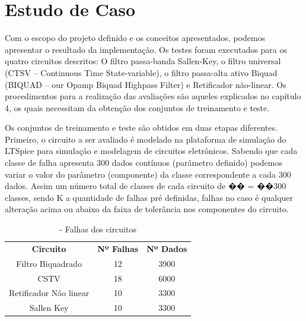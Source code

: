 
\chapter{Estudo de Caso}

Com o escopo do projeto definido e os conceitos apresentados, podemos apresentar o resultado da implementação. Os testes foram executados para os quatro circuitos descritos: O filtro passa-banda Sallen-Key, o filtro universal (CTSV – Continuous Time State-variable), o filtro passa-alta ativo Biquad (BIQUAD – our Opamp Biquad Highpass Filter) e Retificador não-linear. Os procedimentos para a realização das avaliações são aqueles explicados no capítulo 4, os quais necessitam da obtenção dos conjuntos de treinamento e teste.

Os conjuntos de treinamento e teste são obtidos em duas etapas diferentes. Primeiro, o circuito a ser avaliado é modelado na plataforma de simulação do LTSpice para simulação e modelagem de circuitos eletrônicos.   Sabendo que cada classe de falha apresenta 300 dados contínuos (parâmetro definido) podemos variar o valor do parâmetro (componente) da classe correspondente a cada 300 dados.  Assim um número total de classes de cada circuito de �� = ��300 classes, sendo K a quantidade de falhas pré definidas, falhas no caso é qualquer alteração acima ou abaixo da faixa de tolerância nos componentes do circuito. 

\begin{table}[ht]
\centering
\begin{tabular}{ccc}
\textbf{Circuito}      & \textbf{Nº Falhas} & \textbf{Nº Dados} \\
Filtro Biquadrado      & 12                 & 3900              \\
CSTV                   & 18                 & 6000              \\
Retificador Não linear & 10                 & 3300              \\
Sallen Key             & 10                 & 3300             
\end{tabular}
\caption{\label{tab:resultado}- Falhas dos circuitos}
\end{table}


